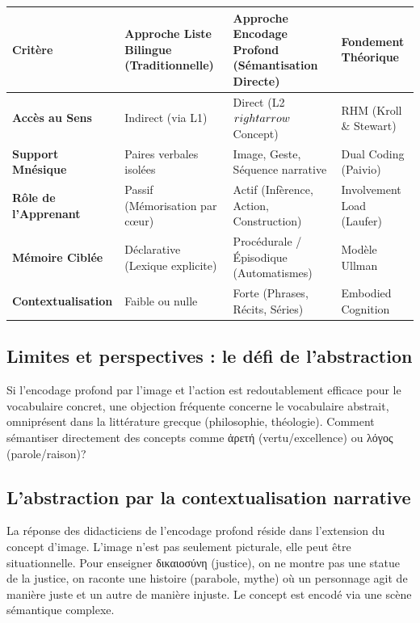 \begin{table}[h!]\small\centering\begin{tabular}{| p{2cm} | p{2.2cm} | p{2.2cm} | p{2.2cm} |}\hline\textbf{Critère} & \textbf{Approche Liste Bilingue (Traditionnelle)} & \textbf{Approche Encodage Profond (Sémantisation Directe)} & \textbf{Fondement Théorique} \\ \hline\textbf{Accès au Sens} & Indirect (via L1) & Direct (L2 $\\rightarrow$ Concept) & RHM (Kroll \& Stewart) \\ \hline\textbf{Support Mnésique} & Paires verbales isolées & Image, Geste, Séquence narrative & Dual Coding (Paivio) \\ \hline\textbf{Rôle de l'Apprenant} & Passif (Mémorisation par cœur) & Actif (Infèrence, Action, Construction) & Involvement Load (Laufer) \\ \hline\textbf{Mémoire Ciblée} & Déclarative (Lexique explicite) & Procédurale / Épisodique (Automatismes) & Modèle Ullman \\ \hline\textbf{Contextualisation} & Faible ou nulle & Forte (Phrases, Récits, Séries) & Embodied Cognition \\ \hline\end{tabular}\end{table}

\subsection{Limites et perspectives : le défi de l'abstraction}

Si l'encodage profond par l'image et l'action est redoutablement efficace pour le vocabulaire
concret, une objection fréquente concerne le vocabulaire abstrait, omniprésent dans la littérature
grecque (philosophie, théologie). Comment \og sémantiser directement\fg{} des concepts comme ἀρετή
(vertu/excellence) ou λόγος (parole/raison)?



\subsection{L'abstraction par la contextualisation narrative}

La réponse des didacticiens de l'encodage profond réside dans l'extension du concept d'image.
L'image n'est pas seulement picturale, elle peut être situationnelle. Pour enseigner δικαιοσύνη
(justice), on ne montre pas une statue de la justice, on raconte une histoire (parabole, mythe) où
un personnage agit de manière juste et un autre de manière injuste. Le concept est encodé via une
\og scène sémantique\fg{} complexe.\cite{III-1-3-ref49}

